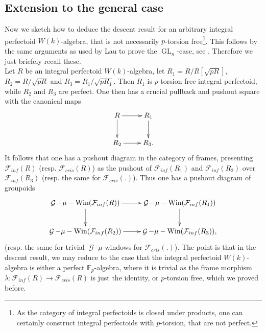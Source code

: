 \documentclass[a4paper,10,5 pt]{amsart}
\theoremstyle{definition}
\DeclareMathOperator{\GL}{GL}
\DeclareMathOperator{\G}{\mathcal{G}}
\begin{document}
\subsection{Extension to the general case}
Now we sketch how to deduce the descent result for an arbitrary integral perfectoid $W(k)$-algebra, that is not necessarily $p$-torsion free\footnote{As the category of integral perfectoids is closed under products, one can certainly construct integral perfectoids with $p$-torsion, that are not perfect.}. This follows by the same arguments as used by Lau to prove the $\GL_{n}$-case, see \cite[Lemma 9.2., Prop. 9.3 ]{Lau perfektoid}. Therefore we just briefely recall these.
\\
Let $R$ be an integral perfectoid $W(k)$-algebra, let $R_{1}=R/R[\sqrt{pR}],$ $R_{2}=R/\sqrt{pR}$ and $R_{3}=R_{1}/\sqrt{pR_{1}}.$ Then $R_{1}$ is $p$-torsion free integral perfectoid, while $R_{2}$ and $R_{3}$ are perfect. One then has a crucial pullback and pushout square with the canonical maps
$$
\xymatrix{
R \ar[r] \ar[d] & R_{1} \ar[d] \\
R_{2} \ar[r] & R_{3}.
}
$$
It follows that one has a  pushout diagram in the category of frames, presenting $\mathcal{F}_{inf}(R)$ (resp. $\mathcal{F}_{cris}(R)$) as the pushout of $\mathcal{F}_{inf}(R_{1})$ and $\mathcal{F}_{inf}(R_{2})$ over $\mathcal{F}_{inf}(R_{3})$ (resp. the same for $\mathcal{F}_{cris}(.)$).
Thus one has a pushout diagram of groupoids
$$
\xymatrix{
\G-\mu-\text{Win}(\mathcal{F}_{inf}(R)) \ar[r] \ar[d] & \G-\mu-\text{Win}(\mathcal{F}_{inf}(R_{1})) \ar[d] \\
\G-\mu-\text{Win}(\mathcal{F}_{inf}(R_{2})) \ar[r] & \G-\mu-\text{Win}(\mathcal{F}_{inf}(R_{3})),
}
$$
(resp. the same for trivial $\G$-$\mu$-windows for $\mathcal{F}_{cris}(.)$). The point is that in the descent result, we may reduce to the case that the integral perfectoid $W(k)$-algebra is either a perfect $\mathbb{F}_{p}$-algebra, where it is trivial as the frame morphism $\lambda\colon \mathcal{F}_{inf}(R)\rightarrow \mathcal{F}_{cris}(R)$ is just the identity, or $p$-torsion free, which we proved before.
\end{document}
